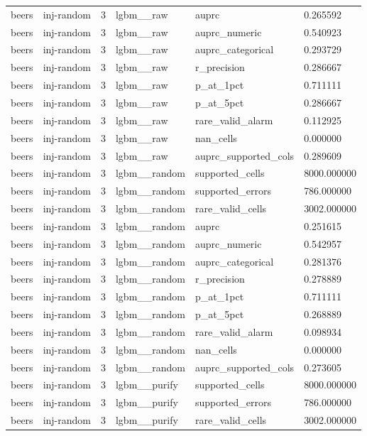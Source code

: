 \begin{tabular}{llllll}
beers & inj-random & 3 & lgbm\_\_raw & auprc & 0.265592 \\
beers & inj-random & 3 & lgbm\_\_raw & auprc\_numeric & 0.540923 \\
beers & inj-random & 3 & lgbm\_\_raw & auprc\_categorical & 0.293729 \\
beers & inj-random & 3 & lgbm\_\_raw & r\_precision & 0.286667 \\
beers & inj-random & 3 & lgbm\_\_raw & p\_at\_1pct & 0.711111 \\
beers & inj-random & 3 & lgbm\_\_raw & p\_at\_5pct & 0.286667 \\
beers & inj-random & 3 & lgbm\_\_raw & rare\_valid\_alarm & 0.112925 \\
beers & inj-random & 3 & lgbm\_\_raw & nan\_cells & 0.000000 \\
beers & inj-random & 3 & lgbm\_\_raw & auprc\_supported\_cols & 0.289609 \\
beers & inj-random & 3 & lgbm\_\_random & supported\_cells & 8000.000000 \\
beers & inj-random & 3 & lgbm\_\_random & supported\_errors & 786.000000 \\
beers & inj-random & 3 & lgbm\_\_random & rare\_valid\_cells & 3002.000000 \\
beers & inj-random & 3 & lgbm\_\_random & auprc & 0.251615 \\
beers & inj-random & 3 & lgbm\_\_random & auprc\_numeric & 0.542957 \\
beers & inj-random & 3 & lgbm\_\_random & auprc\_categorical & 0.281376 \\
beers & inj-random & 3 & lgbm\_\_random & r\_precision & 0.278889 \\
beers & inj-random & 3 & lgbm\_\_random & p\_at\_1pct & 0.711111 \\
beers & inj-random & 3 & lgbm\_\_random & p\_at\_5pct & 0.268889 \\
beers & inj-random & 3 & lgbm\_\_random & rare\_valid\_alarm & 0.098934 \\
beers & inj-random & 3 & lgbm\_\_random & nan\_cells & 0.000000 \\
beers & inj-random & 3 & lgbm\_\_random & auprc\_supported\_cols & 0.273605 \\
beers & inj-random & 3 & lgbm\_\_purify & supported\_cells & 8000.000000 \\
beers & inj-random & 3 & lgbm\_\_purify & supported\_errors & 786.000000 \\
beers & inj-random & 3 & lgbm\_\_purify & rare\_valid\_cells & 3002.000000 \\

\end{tabular}
